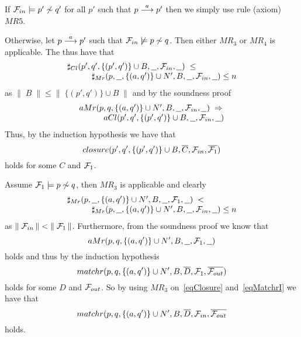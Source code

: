 \begin{theorem}
\begin{trivlist}
\noindent
If ${\cal F}_{in}\models p'\not\sim q'$ for all $p'$ such that $p\stackrel{a}{\longrightarrow}p'$ then we simply use rule (axiom) $MR5$.

\noindent
Otherwise, let $p\stackrel{a}{\longrightarrow}p'$ such that ${\cal F}_{in}\not\models p\not\sim q$. Then either $MR_3$ or $MR_4$ is applicable. The thus have that
\[
\begin{array}{llll}
\multicolumn{4}{l}{\sharp_{Cl}(p',q',\{(p',q')\}\cup B,\underline{\ \ },{\cal F}_{in},\underline{\ \ })\;\leq}\\
&&&\sharp_{Mr}(p,\underline{\ \ },\{(a,q')\}\cup N',B,\underline{\ \ },{\cal F}_{in},\underline{\ \ }) \leq n
\end{array}
\]
as $\|\;B\;\|\leq\|\;\{(p',q')\}\cup B\;\|$ and by the soundness proof
\[
\begin{array}{llll}
\multicolumn{4}{l}{aMr(p,q,\{(a,q')\}\cup N',B,\underline{\ \ },{\cal F}_{in},\underline{\ \ })\;\Rightarrow}\\
&&& aCl(p',q',\{(p',q')\}\cup B,\underline{\ \ },{\cal F}_{in},\underline{\ \ })
\end{array}
\]
Thus, by the induction hypothesis we have that
\begin{equation}\label{eqClosure}
closure(p',q',\{(p',q')\}\cup B,\overline{C},{\cal F}_{in},\overline{{\cal F}_{1}})
\end{equation}
holds for some  $C$ and ${\cal F}_{1}$.

\noindent
Assume ${\cal F}_{1}\models p\not\sim q$, then $MR_3$ is applicable and clearly
\[
\begin{array}{llll}
\multicolumn{4}{l}{\sharp_{Mr}(p,\underline{\ \ },\{(a,q')\}\cup N',B,\underline{\ \ },{\cal F}_{1},\underline{\ \ })\;<}\\
&&&\sharp_{Mr}(p,\underline{\ \ },\{(a,q')\}\cup N',B,\underline{\ \ },{\cal F}_{in},\underline{\ \ }) \leq n
\end{array}
\]
as $\|\;{\cal F}_{in}\,\| < \|\;{\cal F}_{1}\,\|$. Furthermore, from the soundness proof we know that
\[
aMr(p,q,\{(a,q')\}\cup N',B,\underline{\ \ },{\cal F}_{1},\underline{\ \ })\]
holds and thus by the induction hypothesis
\begin{equation}\label{eqMatchrI}
matchr(p,q,\{(a,q')\}\cup N',B,\overline{D},{\cal F}_{1},\overline{{\cal F}_{out}})
\end{equation}
holds for some $D$ and ${\cal F}_{out}$. So by using $MR_3$ on~\ref{eqClosure} and~\ref{eqMatchrI} we have that
\[
matchr(p,q,\{(a,q')\}\cup N',B,\overline{D},{\cal F}_{in},\overline{{\cal F}_{out}}\]
holds.


\end{trivlist}
\end{theorem}
